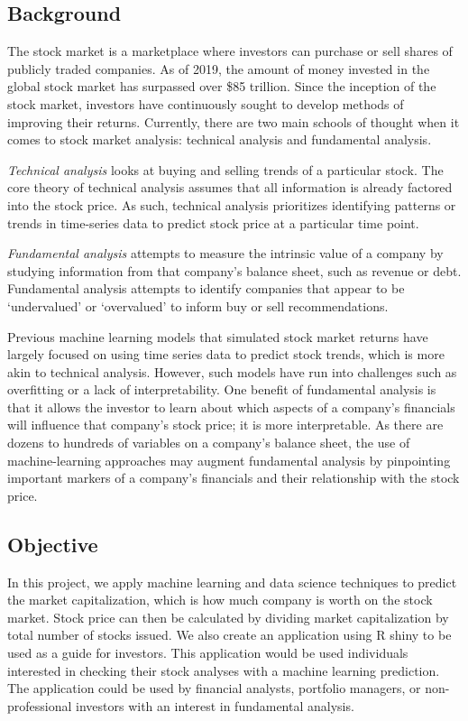 \documentclass[11pt,]{article}
\begin{document}
\hypertarget{background}{%
\subsection{Background}\label{background}}

The stock market is a marketplace where investors can purchase or sell
shares of publicly traded companies. As of 2019, the amount of money
invested in the global stock market has surpassed over \$85 trillion.
Since the inception of the stock market, investors have continuously
sought to develop methods of improving their returns. Currently, there
are two main schools of thought when it comes to stock market analysis:
technical analysis and fundamental analysis.

\emph{Technical analysis} looks at buying and selling trends of a
particular stock. The core theory of technical analysis assumes that all
information is already factored into the stock price. As such, technical
analysis prioritizes identifying patterns or trends in time-series data
to predict stock price at a particular time point.

\emph{Fundamental analysis} attempts to measure the intrinsic value of a
company by studying information from that company's balance sheet, such
as revenue or debt. Fundamental analysis attempts to identify companies
that appear to be `undervalued' or `overvalued' to inform buy or sell
recommendations.

Previous machine learning models that simulated stock market returns
have largely focused on using time series data to predict stock trends,
which is more akin to technical analysis. However, such models have run
into challenges such as overfitting or a lack of interpretability. One
benefit of fundamental analysis is that it allows the investor to learn
about which aspects of a company's financials will influence that
company's stock price; it is more interpretable. As there are dozens to
hundreds of variables on a company's balance sheet, the use of
machine-learning approaches may augment fundamental analysis by
pinpointing important markers of a company's financials and their
relationship with the stock price.

\hypertarget{objective}{%
\subsection{Objective}\label{objective}}

In this project, we apply machine learning and data science techniques
to predict the market capitalization, which is how much company is worth
on the stock market. Stock price can then be calculated by dividing
market capitalization by total number of stocks issued. We also create
an application using R shiny to be used as a guide for investors. This
application would be used individuals interested in checking their stock
analyses with a machine learning prediction. The application could be
used by financial analysts, portfolio managers, or non-professional
investors with an interest in fundamental analysis.
\end{document}
